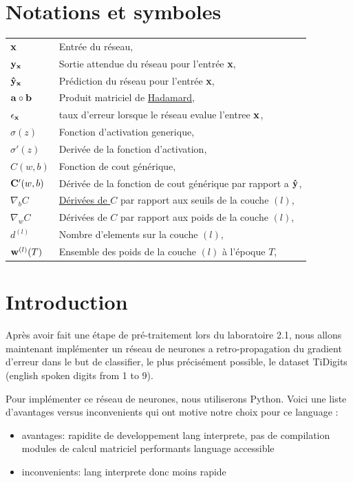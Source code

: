 \documentclass[11pt]{article}
\begin{document}
\EtsPageGenerate
\tableofcontents

\newpage
\section{Notations et symboles}
\begin{tabular}{p{1.75cm}p{10cm}}
	${\bf x}$ & Entr\'ee du r\'eseau, \\
	${\bf y_x}$ & Sortie attendue du r\'eseau pour l'entr\'ee {\bf x}, \\
	${\bf \hat y_x}$ & Pr\'ediction du r\'eseau pour l'entr\'ee {\bf x}, \\
	${\bf a} \circ {\bf b}$ & Produit matriciel de
		\href{https://en.wikipedia.org/wiki/Hadamard_product_(matrices)}
		{Hadamard}, \\
	$\epsilon_{\bf x}$ & taux d'erreur lorsque le r\'eseau evalue l'entree ${\bf x}$, \\
	$\sigma(z)$ & Fonction d'activation generique, \\
	$\sigma'(z)$ & Deriv\'ee de la fonction d'activation, \\
	$C(w, b)$ & Fonction de cout g\'en\'erique, \\
	${\bf C}'(w, b)$ & D\'eriv\'ee de la fonction de cout g\'en\'erique par
		rapport a ${\bf \hat y}$, \\
	$\nabla_bC$ & \href{https://en.wikipedia.org/wiki/Matrix_calculus}
		{D\'eriv\'ees de $C$} par rapport aux seuils de la couche $(l)$, \\
	$\nabla_wC$ & D\'eriv\'ees de $C$ par rapport aux poids de la couche $(l)$, \\
	$d^{(l)}$ & Nombre d'elements sur la couche $(l)$, \\
	${\bf w}^{(l)}(T)$ & Ensemble des poids de la couche $(l)$ \`a l'\'epoque $T$, \\
\end{tabular}
\newpage



\section{Introduction}
Après avoir fait une étape de pré-traitement lors du laboratoire 2.1, nous
allons maintenant implémenter un r\'eseau de neurones a retro-propagation du
gradient d’erreur dans le but de classifier, le plus précisément possible,
le dataset TiDigits (english spoken digits from 1 to 9).

Pour implémenter ce r\'eseau de neurones, nous utiliserons Python.
Voici une liste d'avantages versus inconvenients qui ont motive notre choix
pour ce language :
\begin{itemize}
	\item avantages:
		\subitem rapidite de developpement
		\subitem lang interprete, pas de compilation
		\subitem modules de calcul matriciel performants
		\subitem language accessible
	\item inconvenients:
		\subitem lang interprete donc moins rapide \\
\end{itemize}
\end{document}
